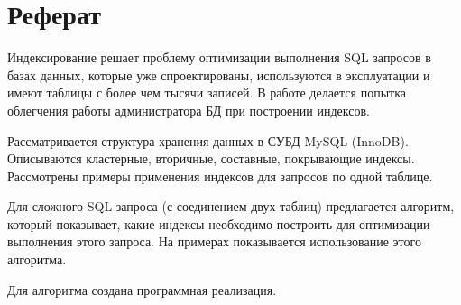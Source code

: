 \chapter{Реферат}

Индексирование решает проблему оптимизации выполнения SQL запросов в базах данных, которые уже спроектированы, используются в эксплуатации и имеют таблицы с более чем тысячи записей. В работе делается попытка облегчения работы администратора БД при построении индексов. 

Рассматривается структура хранения данных в СУБД MySQL (InnoDB). Описываются кластерные, вторичные, составные, покрывающие индексы. Рассмотрены примеры применения индексов для запросов по одной таблице. 

Для сложного SQL запроса (с соединением двух таблиц) предлагается алгоритм, который показывает, какие индексы необходимо построить для оптимизации выполнения этого запроса. На примерах показывается использование этого алгоритма. 

Для алгоритма создана программная реализация.